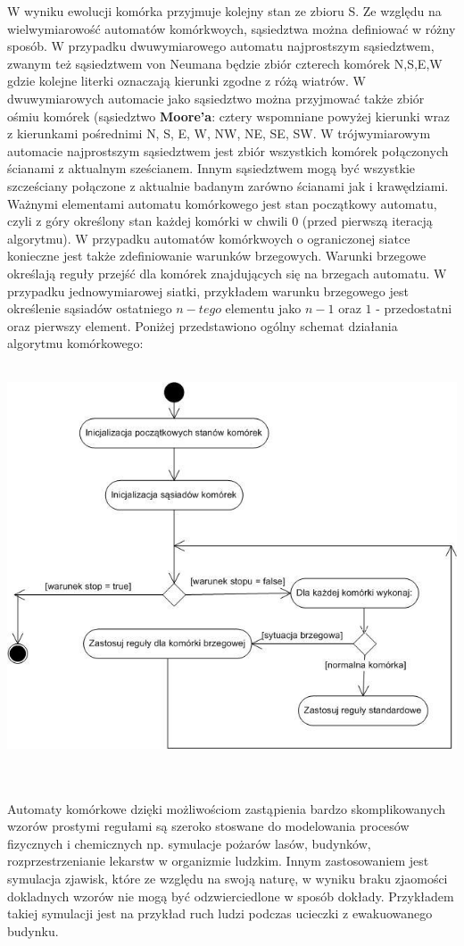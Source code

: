 W wyniku ewolucji komórka przyjmuje kolejny stan ze zbioru S. Ze względu na wielwymiarowość automatów komórkwoych, sąsiedztwa można
definiować w różny sposób. W przypadku dwuwymiarowego automatu najprostszym sąsiedztwem, zwanym też sąsiedztwem von Neumana będzie
zbiór czterech komórek {N,S,E,W} gdzie kolejne literki oznaczają kierunki zgodne z różą wiatrów. W dwuwymiarowych automacie jako sąsiedztwo można przyjmować także zbiór ośmiu komórek (sąsiedztwo \textbf{Moore'a}: cztery wspomniane powyżej kierunki wraz z kierunkami pośrednimi {N, S, E, W, NW, NE, SE, SW}. W trójwymiarowym automacie najprostszym sąsiedztwem jest zbiór wszystkich 
komórek połączonych ścianami z aktualnym sześcianem. Innym sąsiedztwem mogą być wszystkie szcześciany połączone z aktualnie badanym
zarówno ścianami jak i krawędziami. Ważnymi elementami automatu komórkowego jest stan początkowy automatu, czyli z góry określony
stan każdej komórki w chwili 0 (przed pierwszą iteracją algorytmu). W przypadku automatów komórkwoych o ograniczonej siatce konieczne
jest także zdefiniowanie warunków brzegowych. Warunki brzegowe określają reguły przejść dla komórek znajdujących się na brzegach
automatu. W przypadku jednowymiarowej siatki, przykładem warunku brzegowego jest określenie sąsiadów ostatniego $n-tego$ elementu jako 
$n-1$ oraz $1$ - przedostatni oraz pierwszy element.
Poniżej przedstawiono ogólny schemat działania algorytmu komórkowego: \\\\
\begin{center}
\includegraphics{algorytm_automatu_kom}
\end{center}
\\\\
Automaty komórkowe dzięki możliwościom zastąpienia bardzo skomplikowanych wzorów prostymi regułami są szeroko stoswane do modelowania
procesów fizycznych i chemicznych np. symulacje pożarów lasów, budynków, rozprzestrzenianie lekarstw w organizmie ludzkim. 
Innym zastosowaniem jest symulacja zjawisk, które ze względu na swoją naturę, w wyniku braku zjaomości
dokladnych wzorów nie mogą być odzwierciedlone w sposób dokłady. Przykładem takiej symulacji jest na przykład ruch ludzi podczas ucieczki z ewakuowanego budynku.

